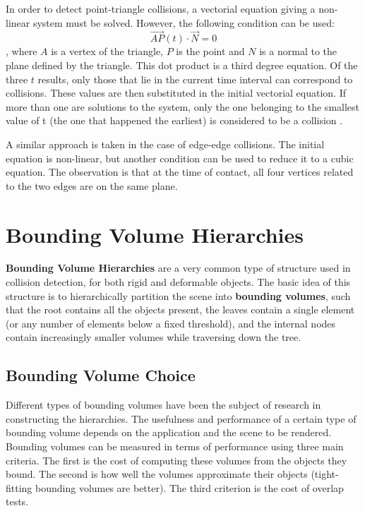 In order to detect point-triangle collisions, a vectorial equation giving a non-linear system must be solved. However, the following condition can be used: \[\overrightarrow{AP}(t) \cdot \overrightarrow{N} = 0\], where $A$ is a vertex of the triangle, $P$ is the point and $N$ is a normal to the plane defined by the triangle. This dot product is a third degree equation. Of the three $t$ results, only those that lie in the current time interval can correspond to collisions. These values are then substituted in the initial vectorial equation. If more than one are solutions to the system, only the one belonging to the smallest value of t (the one that happened the earliest) is considered to be a collision \citep{provot97}.

A similar approach is taken in the case of edge-edge collisions. The initial equation is non-linear, but another condition can be used to reduce it to a cubic equation. The observation is that at the time of contact, all four vertices related to the two edges are on the same plane.


\section{Bounding Volume Hierarchies}
\label{sec:bvh}


\textbf{Bounding Volume Hierarchies} are a very common type of structure used in collision detection, for both rigid and deformable objects. The basic idea of this structure is to hierarchically partition the scene into \textbf{bounding volumes}, such that the root contains all the objects present, the leaves contain a single element (or any number of elements below a fixed threshold), and the internal nodes contain increasingly smaller volumes while traversing down the tree.

\subsection{Bounding Volume Choice}
\label{sub-sec:bvc}

Different types of bounding volumes have been the subject of research in constructing the hierarchies. The usefulness and performance of a certain type of bounding volume depends on the application and the scene to be rendered. Bounding volumes can be measured in terms of performance using three main criteria. The first is the cost of computing these volumes from the objects they bound. The second is how well the volumes approximate their objects (tight-fitting bounding volumes are better). The third criterion is the cost of overlap tests.


